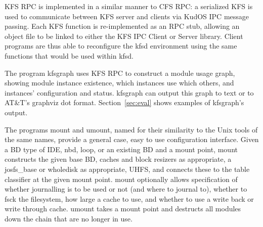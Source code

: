 KFS RPC is implemented in a similar manner to CFS RPC: a serialized KFS is used
to communicate between KFS server and clients via KudOS IPC message passing.
Each KFS function is re-implemented as an RPC stub, allowing an object file to
be linked to either the KFS IPC Client or Server library. Client programs are
thus able to reconfigure the kfsd environment using the same functions that
would be used within kfsd.

The program kfsgraph uses KFS RPC to construct a module usage graph, showing
module instance existence, which instances use which others, and instances'
configuration and status. kfsgraph can output this graph to text or to AT\&T's
graphviz dot format. Section~\ref{sec:eval} shows examples of kfsgraph's output.

The programs mount and umount, named for their similarity to the Unix tools of
the same names, provide a general case, easy to use configuration interface.
Given a BD type of IDE, nbd, loop, or an existing BD and a mount point, mount
constructs the given base BD, caches and block resizers as appropriate, a
josfs\_base or wholedisk as appropriate, UHFS, and connects these to the table
classifier at the given mount point. mount optionally allows specification of
whether journalling is to be used or not (and where to journal to), whether to
fsck the filesystem, how large a cache to use, and whether to use a write back
or write through cache. umount takes a mount point and destructs all modules
down the chain that are no longer in use.

